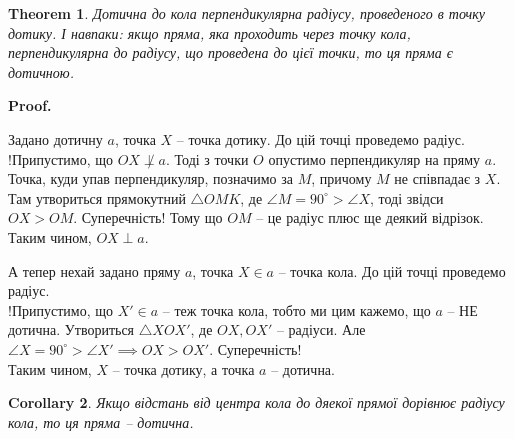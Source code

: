 \documentclass[a4paper, 10pt]{article}
\makeatletter
\def\qed{$\blacksquare$}
\theoremstyle{theoremdd}
\newtheorem{theorem}{Theorem}[subsection]
\theoremstyle{theoremdd}
\theoremstyle{theoremdd}
\theoremstyle{theoremdd}
\theoremstyle{theoremdd}
\theoremstyle{theoremdd}
\theoremstyle{theoremdd}
\theoremstyle{theoremdd}
\theoremstyle{theoremdd}
\newtheorem{corollary}[theorem]{Corollary}
\renewenvironment{proof}[1][Proof.\\]{\par
\pushQED{\hfill \qed}%
\normalfont \topsep6\p@\@plus6\p@\relax
\trivlist
\item\relax
{\bfseries
#1\@addpunct{.}}\hspace\labelsep\ignorespaces
}{%
\popQED\endtrivlist\@endpefalse
}
\makeatother
\begin{document}
\begin{theorem}
Дотична до кола перпендикулярна радіусу, проведеного в точку дотику. І навпаки: якщо пряма, яка проходить через точку кола, перпендикулярна до радіусу, що проведена до цієї точки, то ця пряма є дотичною.
\end{theorem}

\begin{proof}
Задано дотичну $a$, точка $X$ -- точка дотику. До цій точці проведемо радіус.\\
!Припустимо, що $OX \not \perp a$. Тоді з точки $O$ опустимо перпендикуляр на пряму $a$. Точка, куди упав перпендикуляр, позначимо за $M$, причому $M$ не співпадає з $X$.\\
Там утвориться прямокутний $\triangle OMK$, де $\angle M = 90^\circ > \angle X$, тоді звідси $OX > OM$. Суперечність! Тому що $OM$ -- це радіус плюс ще деякий відрізок.\\
Таким чином, $OX \perp a$.
\begin{figure}[H]
\centering
{}
\end{figure}
А тепер нехай задано пряму $a$, точка $X \in a$ -- точка кола. До цій точці проведемо радіус.\\
!Припустимо, що $X' \in a$ -- теж точка кола, тобто ми цим кажемо, що $a$ -- НЕ дотична. Утвориться $\triangle XOX'$, де $OX,OX'$ -- радіуси. Але $\angle X = 90^\circ > \angle X' \implies OX > OX'$. Суперечність!\\
Таким чином, $X$ -- точка дотику, а точка $a$ -- дотична.
\end{proof}

\begin{corollary}
Якщо відстань від центра кола до дяекої прямої дорівнює радіусу кола, то ця пряма -- дотична.
\end{corollary}
\end{document}
